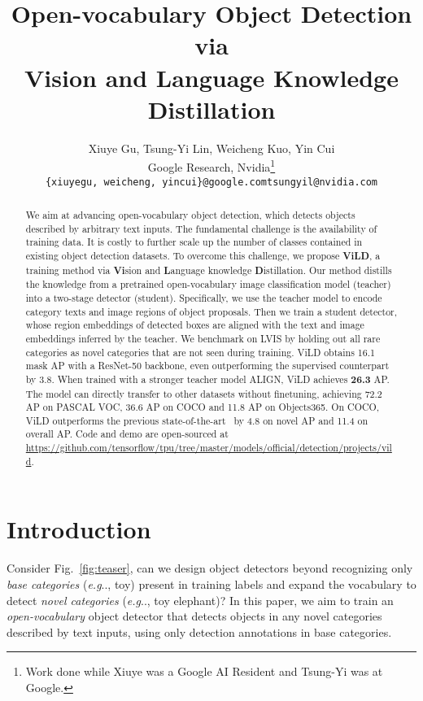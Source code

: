 \documentclass{article} \usepackage{iclr2022_conference,times}
\title{Open-vocabulary Object Detection via \\
Vision and Language Knowledge Distillation}
\author{
Xiuye Gu, Tsung-Yi Lin, Weicheng Kuo, Yin Cui \\
Google Research,
Nvidia\thanks{Work done while Xiuye was a Google AI Resident and Tsung-Yi was at Google.}\\
\texttt{\{xiuyegu, weicheng, yincui\}@google.com}\quad\quad\texttt{tsungyil@nvidia.com}
}
\makeatletter
\DeclareRobustCommand\onedot{\futurelet\@let@token\@onedot}
\def\@onedot{\ifx\@let@token.\else.\null\fi\xspace}
\def\eg{\emph{e.g}\onedot} \def\Eg{\emph{E.g}\onedot}
\makeatother
\begin{document}
\maketitle

\begin{abstract}
We aim at advancing open-vocabulary object detection, which detects objects described by arbitrary text inputs.
The fundamental challenge is the availability of training data. 
It is costly to further scale up the number of classes contained in existing object detection datasets.
To overcome this challenge, we propose \textbf{ViLD}, a training method via \textbf{Vi}sion and \textbf{L}anguage knowledge \textbf{D}istillation.
Our method distills the knowledge from a pretrained open-vocabulary image classification model (teacher) into a two-stage detector (student).
Specifically, we use the teacher model to encode category texts and image regions of object proposals.
Then we train a student detector, whose region embeddings of detected boxes are aligned with the text and image embeddings inferred by the teacher.
We benchmark on LVIS by holding out all rare categories as novel categories that are not seen during training. 
ViLD obtains 16.1 mask AP with a ResNet-50 backbone, even outperforming the supervised counterpart by 3.8. When trained with a stronger teacher model ALIGN, ViLD achieves \textbf{26.3} AP.
The model can directly transfer to other datasets without finetuning, achieving 72.2 AP on PASCAL VOC, 36.6 AP on COCO and 11.8 AP on Objects365.
On COCO, ViLD outperforms the previous state-of-the-art~\citep{zareian2021openvocabulary} by 4.8 on novel AP and 11.4 on overall AP.
Code and demo are open-sourced at \url{https://github.com/tensorflow/tpu/tree/master/models/official/detection/projects/vild}.
\end{abstract}




\section{Introduction}
Consider Fig.~\ref{fig:teaser}, can we design object detectors beyond recognizing only \textit{base categories} (\eg, toy) present in training labels and expand the vocabulary to detect \textit{novel categories} (\eg, toy elephant)? In this paper, we aim to train an \textit{open-vocabulary} object detector that detects objects in any novel categories described by text inputs, using only detection annotations in base categories.
\end{document}
